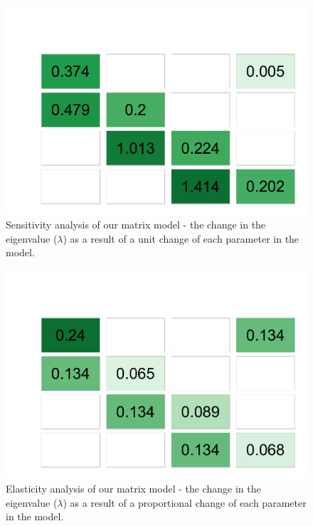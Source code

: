 \documentclass[
]{article}
\begin{document}
\begin{figure}
\centering
\includegraphics{Wulfing_CH1_Appendix_files/figure-latex/sensitivity-1.pdf}
\caption{\label{fig:sensitivity}Sensitivity analysis of our matrix model - the change in the eigenvalue (\(\lambda\)) as a result of a unit change of each parameter in the model. \label{sensitivity}}
\end{figure}



\begin{figure}
\centering
\includegraphics{Wulfing_CH1_Appendix_files/figure-latex/elasticity-1.pdf}
\caption{\label{fig:elasticity}Elasticity analysis of our matrix model - the change in the eigenvalue (\(\lambda\)) as a result of a proportional change of each parameter in the model. \label{elasticity}}
\end{figure}
\end{document}
